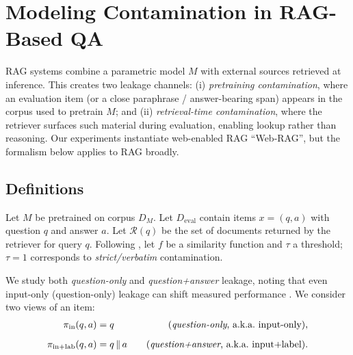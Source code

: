\section{Modeling Contamination in RAG-Based QA}
\label{sec:methods-contam}


RAG systems combine a parametric model $M$ with external sources retrieved at inference. This creates two leakage channels: (i) \emph{pretraining contamination}, where an evaluation item (or a close paraphrase / answer-bearing span) appears in the corpus used to pretrain $M$; and (ii) \emph{retrieval-time contamination}, where the retriever surfaces such material during evaluation, enabling lookup rather than reasoning. Our experiments instantiate web-enabled RAG ``Web-RAG'', but the formalism below applies to RAG broadly.

\subsection{Definitions}

Let $M$ be pretrained on corpus $D_M$. Let $D_{\text{eval}}$ contain items $x=(q,a)$ with question $q$ and answer $a$. Let $\mathcal{R}(q)$ be the set of documents returned by the retriever for query $q$. Following \citet{ravautComprehensiveSurveyContamination2025a}, let $f$ be a similarity function and $\tau$ a threshold; $\tau{=}1$ corresponds to \emph{strict/verbatim} contamination.

We study both \emph{question-only} and \emph{question+answer} leakage, noting that even input-only (question-only) leakage can shift measured performance \cite{liOpenSourceData2024}.
We consider two views of an item:
\begin{align*}
\pi_{\text{in}}(q,a) &= q 
\quad &\text{(\emph{question-only}, a.k.a.\ input-only)}, \\[6pt]
\pi_{\text{in+lab}}(q,a) &= q \,\Vert\, a 
\quad &\text{(\emph{question+answer}, a.k.a.\ input+label)}.
\end{align*}


